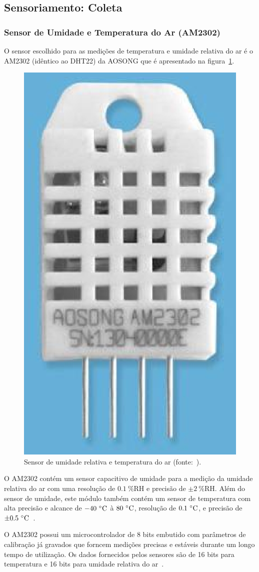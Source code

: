 \subsection{Sensoriamento: Coleta}


	\subsubsection{Sensor de Umidade e Temperatura do Ar (AM2302)}

		O sensor escolhido para as medições de temperatura e umidade relativa do ar
		é o AM2302 (idêntico ao DHT22) da AOSONG que é apresentado na figura~\ref{fig:AM2302}.

		\begin{figure}[!htbp]
		\begin{center}
		\includegraphics[width=.4\textwidth]{figuras/am2302.eps}
		\caption{\label{fig:AM2302}Sensor de umidade relativa e temperatura do ar (fonte:~).}
		\end{center}
		\end{figure}

		O AM2302 contém um sensor capacitivo de umidade para a medição da umidade relativa
		do ar com uma resolução de $0.1~\%\textrm{RH}$ e precisão de $\pm 2~\%\textrm{RH}$.
		Além do sensor de umidade, este módulo também contém um sensor de temperatura com
		alta precisão e alcance de $-40~\celsius$ à $80~\celsius$, resolução de $0.1~\celsius$,
		e precisão de $\pm 0.5~\celsius$~\cite{aosong}.

		O AM2302 possui um microcontrolador de 8 bits embutido com parâmetros de calibração já gravados
		que forncem medições precisas e estáveis durante um longo tempo de utilização.
		Os dados fornecidos pelos sensores são de 16 bits para temperatura e
		16 bits para umidade relativa do ar~\cite{aosong}.

